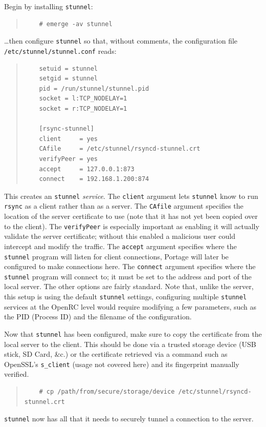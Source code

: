 \documentclass{article}
\begin{document}
Begin by installing \texttt{stunnel}:
\begin{quote}
\begin{verbatim}
	# emerge -av stunnel
\end{verbatim}
\end{quote}
\ldots then configure \texttt{stunnel} so that, without comments, the configuration file \texttt{/etc/stunnel/stunnel.conf} reads:
\begin{quote}
\begin{verbatim}
	setuid = stunnel
	setgid = stunnel
	pid = /run/stunnel/stunnel.pid
	socket = l:TCP_NODELAY=1
	socket = r:TCP_NODELAY=1

	[rsync-stunnel]
	client     = yes
	CAfile     = /etc/stunnel/rsyncd-stunnel.crt
	verifyPeer = yes
	accept     = 127.0.0.1:873
	connect    = 192.168.1.200:874
\end{verbatim}
\end{quote}
This creates an \texttt{stunnel} \emph{service}.  The \texttt{client} argument lets \texttt{stunnel} know to run \texttt{rsync} as a client rather than as a server.  The \texttt{CAfile} argument specifies the location of the server certificate to use (note that it has not yet been copied over to the client).  The \texttt{verifyPeer} is especially important as enabling it will actually validate the server certificate; without this enabled a malicious user could intercept and modify the traffic.  The \texttt{accept} argument specifies where the \texttt{stunnel} program will listen for client connections, Portage will later be configured to make connections here.  The \texttt{connect} argument specifies where the \texttt{stunnel} program will connect to; it must be set to the address and port of the local server.  The other options are fairly standard.  Note that, unlike the server, this setup is using the default \texttt{stunnel} settings, configuring multiple \texttt{stunnel} services at the OpenRC level would require modifying a few parameters, such as the PID (Process ID) and the filename of the configuration.

Now that \texttt{stunnel} has been configured, make sure to copy the certificate from the local server to the client.  This should be done via a trusted storage device (USB stick, SD Card, \&c.) or the certificate retrieved via a command such as OpenSSL's \texttt{s\_client} (usage not covered here) and its fingerprint manually verified.
\begin{quote}
\begin{verbatim}
	# cp /path/from/secure/storage/device /etc/stunnel/rsyncd-stunnel.crt
\end{verbatim}
\end{quote}
\texttt{stunnel} now has all that it needs to securely tunnel a connection to the server.
\end{document}
